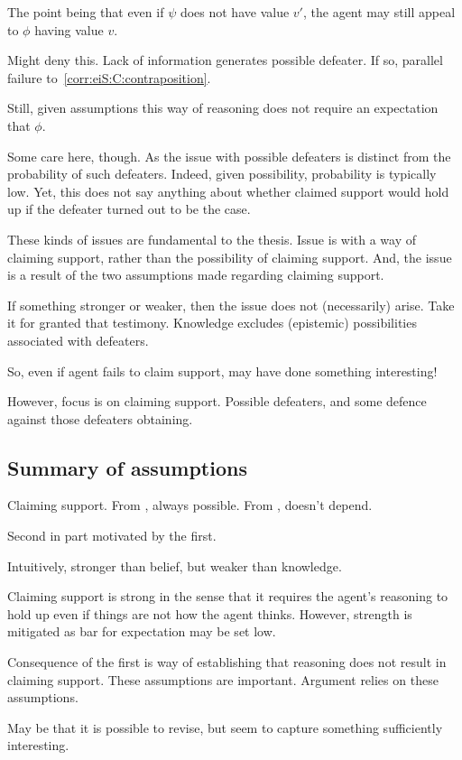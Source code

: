 \begin{note}
  The point being that even if \(\psi\) does not have value \(v'\), the agent may still appeal to \(\phi\) having value \(v\).

  Might deny this.
  Lack of information generates possible defeater.
  If so, parallel failure to~\autoref{corr:eiS:C:contraposition}.

  Still, given assumptions this way of reasoning does not require an expectation that \(\phi\).

  {
    \color{red}
    Some care here, though.
    As the issue with possible defeaters is distinct from the probability of such defeaters.
    Indeed, given possibility, probability is typically low.
    Yet, this does not say anything about whether claimed support would hold up if the defeater turned out to be the case.
  }
\end{note}

\begin{note}
  These kinds of issues are fundamental to the thesis.
  Issue is with a way of claiming support, rather than the possibility of claiming support.
  And, the issue is a result of the two assumptions made regarding claiming support.

  If something stronger or weaker, then the issue does not (necessarily) arise.
  Take it for granted that testimony.
  Knowledge excludes (epistemic) possibilities associated with defeaters.

  So, even if agent fails to claim support, may have done something interesting!

  However, focus is on claiming support.
  Possible defeaters, and some defence against those defeaters obtaining.
\end{note}

\subsection{Summary of assumptions}

\begin{note}
  Claiming support.
  From \nfcs{}, always possible.
  From \eiS{}, doesn't depend.

  Second in part motivated by the first.

  Intuitively, stronger than belief, but weaker than knowledge.

  {
    \color{red}
    Claiming support is strong in the sense that it requires the agent's reasoning to hold up even if things are not how the agent thinks.
    However, strength is mitigated as bar for expectation may be set low.
  }

  Consequence of the first is way of establishing that reasoning does not result in claiming support.
  These assumptions are important.
  Argument relies on these assumptions.

  May be that it is possible to revise, but seem to capture something sufficiently interesting.
\end{note}

